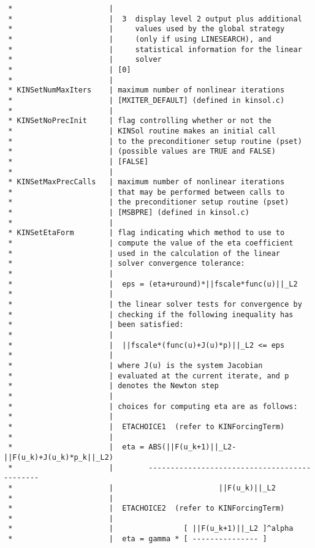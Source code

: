 \documentclass[11pt]{article}
\begin{document}
\begin{verbatim}
 *                      |
 *                      |  3  display level 2 output plus additional
 *                      |     values used by the global strategy
 *                      |     (only if using LINESEARCH), and
 *                      |     statistical information for the linear
 *                      |     solver
 *                      | [0]
 *                      |
 * KINSetNumMaxIters    | maximum number of nonlinear iterations
 *                      | [MXITER_DEFAULT] (defined in kinsol.c)
 *                      |
 * KINSetNoPrecInit     | flag controlling whether or not the
 *                      | KINSol routine makes an initial call
 *                      | to the preconditioner setup routine (pset)
 *                      | (possible values are TRUE and FALSE)
 *                      | [FALSE]
 *                      |
 * KINSetMaxPrecCalls   | maximum number of nonlinear iterations
 *                      | that may be performed between calls to
 *                      | the preconditioner setup routine (pset)
 *                      | [MSBPRE] (defined in kinsol.c)
 *                      |
 * KINSetEtaForm        | flag indicating which method to use to
 *                      | compute the value of the eta coefficient
 *                      | used in the calculation of the linear
 *                      | solver convergence tolerance:
 *                      |
 *                      |  eps = (eta+uround)*||fscale*func(u)||_L2
 *                      |
 *                      | the linear solver tests for convergence by
 *                      | checking if the following inequality has
 *                      | been satisfied:
 *                      |
 *                      |  ||fscale*(func(u)+J(u)*p)||_L2 <= eps
 *                      |
 *                      | where J(u) is the system Jacobian
 *                      | evaluated at the current iterate, and p
 *                      | denotes the Newton step
 *                      |
 *                      | choices for computing eta are as follows:
 *                      |
 *                      |  ETACHOICE1  (refer to KINForcingTerm)
 *                      |
 *                      |  eta = ABS(||F(u_k+1)||_L2-||F(u_k)+J(u_k)*p_k||_L2)
 *                      |        ---------------------------------------------
 *                      |                        ||F(u_k)||_L2
 *                      | 
 *                      |  ETACHOICE2  (refer to KINForcingTerm)
 *                      |
 *                      |                [ ||F(u_k+1)||_L2 ]^alpha
 *                      |  eta = gamma * [ --------------- ]

\end{verbatim}
\end{document}
